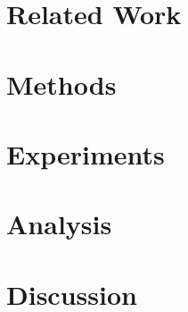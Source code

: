 \documentclass[10pt,final,conference]{IEEEtran}
\begin{document}
\section{Related Work}


\section{Methods}


\section{Experiments}


\section{Analysis}


\section{Discussion}




\end{document}
